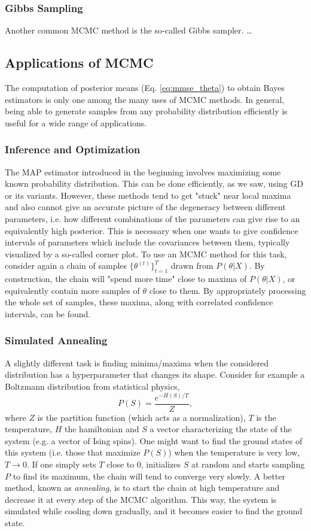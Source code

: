 \documentclass{article}
\begin{document}
\subsubsection*{Gibbs Sampling}
Another common MCMC method is the so-called Gibbs sampler. \dots

\subsection{Applications of MCMC}
The computation of posterior means (Eq. \ref{eq:mmse_theta}) to obtain Bayes estimators is only one among the many uses of MCMC methods. In general, being able to generate samples from any probability distribution efficiently is useful for a wide range of applications.
\subsubsection*{Inference and Optimization}
The MAP estimator introduced in the beginning involves maximizing some known probability distribution. This can be done efficiently, as we saw, using GD or its variants. However, these methods tend to get "stuck" near local maxima and also cannot give an accurate picture of the degeneracy between different parameters, i.e. how different combinations of the parameters can give rise to an equivalently high posterior. This is necessary when one wants to give confidence intervals of parameters which include the covariances between them, typically visualized by a so-called corner plot. To use an MCMC method for this task, consider again a chain of samples $\{\theta^{(t)}\}_{t=1}^T$ drawn from $P(\theta | X)$. By construction, the chain will "spend more time" close to maxima of $P(\theta | X)$, or equivalently contain more samples of $\theta$ close to them. By appropriately processing the whole set of samples, these maxima, along with correlated confidence intervals, can be found.
\subsubsection*{Simulated Annealing}
A slightly different task is finding minima/maxima when the considered distribution has a hyperparameter that changes its shape. Consider for example a Boltzmann distribution from statistical physics,
\begin{equation}
    P(S) = \frac{e^{-H(S)/T}}{Z},
\end{equation}
where $Z$ is the partition function (which acts as a normalization), $T$ is the temperature, $H$ the hamiltonian and $S$ a vector characterizing the state of the system (e.g. a vector of Ising spins). One might want to find the ground states of this system (i.e. those that maximize $P(S)$) when the temperature is very low, $T\rightarrow 0$. If one simply sets $T$ close to 0, initializes $S$ at random and starts sampling $P$ to find its maximum, the chain will tend to converge very slowly. A better method, known as \emph{annealing}, is to start the chain at high temperature and decrease it at every step of the MCMC algorithm. This way, the system is simulated while cooling down gradually, and it becomes easier to find the ground state.
\end{document}
